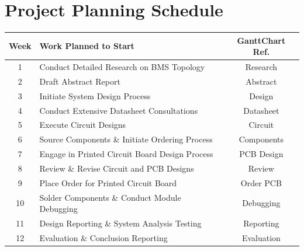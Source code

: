 \chapter{Project Planning Schedule}
\makeatletter{}\makeatother
\label{appen:PP}

\begin{table}[h]
\centering
\begin{tabularx}{\textwidth}{|c|X|c|}
\hline
\textbf{Week} & \textbf{Work Planned to Start} & \textbf{GanttChart Ref.} \\
\hline
1 & Conduct Detailed Research on BMS Topology & Research \\
\hline
2 & Draft Abstract Report & Abstract \\
\hline
3 & Initiate System Design Process & Design \\
\hline
4 & Conduct Extensive Datasheet Consultations & Datasheet \\
\hline
5 & Execute Circuit Designs & Circuit \\
\hline
6 & Source Components \& Initiate Ordering Process & Components \\
\hline
7 & Engage in Printed Circuit Board Design Process & PCB Design \\
\hline
8 & Review \& Revise Circuit and PCB Designs & Review \\
\hline
9 & Place Order for Printed Circuit Board & Order PCB \\
\hline
10 & Solder Components \& Conduct Module Debugging & Debugging \\
\hline
11 & Design Reporting \& System Analysis Testing & Reporting \\
\hline
12 & Evaluation \& Conclusion Reporting & Evaluation \\
\hline
\end{tabularx}
\end{table}
     \begin{figure}[!htb]
     \centering
	\label{fig:ProjectShed}
	\end{figure}